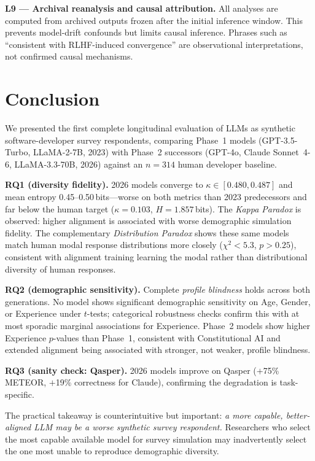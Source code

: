 \documentclass[12pt,a4paper]{article}
\newcommand{\kp}{\textit{Kappa Paradox}\xspace}
\newcommand{\distrpar}{\textit{Distribution Paradox}\xspace}
\newcommand{\pb}{\textit{profile blindness}\xspace}
\begin{document}
\noindent\textbf{L9 --- Archival reanalysis and causal attribution.}
All analyses are computed from archived outputs frozen after the initial
inference window.
This prevents model-drift confounds but limits causal inference.
Phrases such as ``consistent with RLHF-induced convergence'' are
observational interpretations, not confirmed causal mechanisms.

\section{Conclusion}
\label{sec:conclusion}

We presented the first complete longitudinal evaluation of LLMs as
synthetic software-developer survey respondents, comparing Phase~1
models (GPT-3.5-Turbo, LLaMA-2-7B, 2023) with Phase~2 successors
(GPT-4o, Claude Sonnet~4-6, LLaMA-3.3-70B, 2026) against an $n{=}314$
human developer baseline.

\textbf{RQ1 (diversity fidelity).}
2026 models converge to $\kappa \in [0.480, 0.487]$ and mean entropy
0.45--0.50\,bits---worse on both metrics than 2023 predecessors and
far below the human target ($\kappa{=}0.103$, $H{=}1.857$\,bits).
The \kp is observed: higher alignment is associated with worse
demographic simulation fidelity.
The complementary \distrpar shows these same models match human modal
response distributions more closely ($\chi^2 < 5.3$, $p > 0.25$),
consistent with alignment training learning the modal rather than
distributional diversity of human responses.

\textbf{RQ2 (demographic sensitivity).}
Complete \pb holds across both generations.
No model shows significant demographic sensitivity on Age, Gender, or
Experience under $t$-tests; categorical robustness checks confirm this
with at most sporadic marginal associations for Experience.
Phase~2 models show higher Experience $p$-values than Phase~1,
consistent with Constitutional AI and extended alignment being
associated with stronger, not weaker, profile blindness.

\textbf{RQ3 (sanity check: Qasper).}
2026 models improve on Qasper ($+$75\% METEOR, $+$19\% correctness
for Claude), confirming the degradation is task-specific.

The practical takeaway is counterintuitive but important: \emph{a more
capable, better-aligned LLM may be a worse synthetic survey respondent.}
Researchers who select the most capable available model for survey
simulation may inadvertently select the one most unable to reproduce
demographic diversity.
\end{document}
